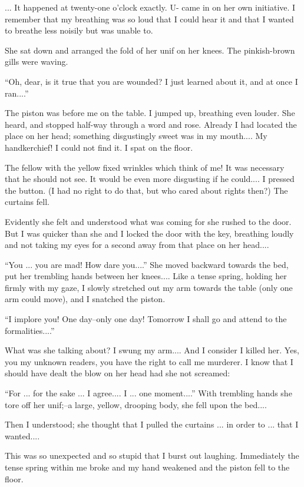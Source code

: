 \documentclass[11pt,openany]{book}
\begin{document}
... It happened at twenty-one o'clock exactly. U- came in on her own initiative. I remember that my breathing was so loud that I could hear it and that I wanted to breathe less noisily but was unable to.

She sat down and arranged the fold of her unif on her knees. The pinkish-brown gills were waving.

``Oh, dear, is it true that you are wounded? I just learned about it, and at once I ran....''

The piston was before me on the table. I jumped up, breathing even louder. She heard, and stopped half-way through a word and rose. Already I had located the place on her head; something disgustingly sweet was in my mouth.... My handkerchief! I could not find it. I spat on the floor.

The fellow with the yellow fixed wrinkles which think of me! It was necessary that he should not see. It would be even more disgusting if he could.... I pressed the button. (I had no right to do that, but who cared about rights then?) The curtains fell.

Evidently she felt and understood what was coming for she rushed to the door. But I was quicker than she and I locked the door with the key, breathing loudly and not taking my eyes for a second away from that place on her head....

``You ... you are mad! How dare you....'' She moved backward towards the bed, put her trembling hands between her knees.... Like a tense spring, holding her firmly with my gaze, I slowly stretched out my arm towards the table (only one arm could move), and I snatched the piston.

``I implore you! One day--only one day! Tomorrow I shall go and attend to the formalities....''

What was she talking about? I swung my arm.... And I consider I killed her. Yes, you my unknown readers, you have the right to call me murderer. I know that I should have dealt the blow on her head had she not screamed:

``For ... for the sake ... I agree.... I ... one moment....'' With trembling hands she tore off her unif;--a large, yellow, drooping body, she fell upon the bed....

Then I understood; she thought that I pulled the curtains ... in order to ... that I wanted....

This was so unexpected and so stupid that I burst out laughing. Immediately the tense spring within me broke and my hand weakened and the piston fell to the floor.
\end{document}

